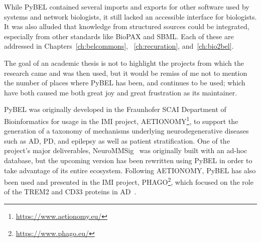 While PyBEL contained several imports and exports for other software used by systems and network biologists, it still lacked an accessible interface for biologists.
It was also alluded that knowledge from structured sources could be integrated, especially from other standards like \ac{BioPAX} and \ac{SBML}.
Each of these are addressed in Chapters~\ref{ch:belcommons}, ~\ref{ch:recuration}, and~\ref{ch:bio2bel}.

The goal of an academic thesis is not to highlight the projects from which the research came and was then used, but it would be remiss of me not to mention the number of places where PyBEL has been, and continues to be used; which have both caused me both great joy and great frustration as its maintainer.

PyBEL was originally developed in the Fraunhofer SCAI Department of Bioinformatics for usage in the \ac{IMI} project, AETIONOMY\footnote{\url{https://www.aetionomy.eu/}}, to support the generation of a taxonomy of mechanisms underlying neurodegenerative diseases such as \ac{AD}, \ac{PD}, and epilepsy as well as patient stratification.
One of the project's major deliverables, NeuroMMSig~\cite{Domingo-Fernandez2017} was originally built with an ad-hoc database, but the upcoming version has been rewritten using PyBEL in order to take advantage of its entire ecosystem.
Following AETIONOMY, PyBEL has also been used and presented in the \ac{IMI} project, PHAGO\footnote{\url{https://www.phago.eu/}}, which focused on the role of the TREM2 and CD33 proteins in \ac{AD}~\cite{Ebeling2017}.

